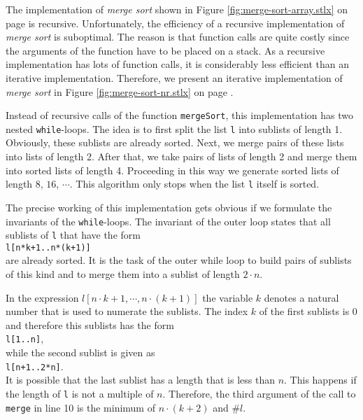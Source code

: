 \noindent
The implementation of \emph{merge sort} shown in Figure \ref{fig:merge-sort-array.stlx} on page
\pageref{fig:merge-sort-array.stlx} is recursive.  Unfortunately, the efficiency of a recursive
implementation of \emph{merge sort} is suboptimal.  The reason is that function calls are quite
costly since the arguments of the function have to be placed on a stack.  As a recursive
implementation has lots of function calls, it is considerably less efficient than an iterative
implementation.  Therefore, we present an iterative implementation of \emph{merge sort} in Figure
\ref{fig:merge-sort-nr.stlx} on page \pageref{fig:merge-sort-nr.stlx}.

Instead of recursive calls of the function \texttt{mergeSort}, this implementation has two nested 
\texttt{while}-loops.  The idea is to first split the list \texttt{l} into sublists of length 1.
Obviously, these sublists are already sorted.  Next, we merge pairs of these lists into lists of
length 2.  After that, we take pairs of lists of length 2 and merge them into sorted lists of length
4. Proceeding in this way we generate sorted lists of length
$8$, $16$, $\cdots$.  This algorithm only stops when the list \texttt{l} itself is sorted.

The precise working of this implementation gets obvious if we formulate the invariants of the
\texttt{while}-loops.  The invariant of the outer loop states that all sublists of \texttt{l} 
that have the form
\\[0.2cm]
\hspace*{1.3cm}
\texttt{l[n*k+1..n*(k+1)]}
\\[0.2cm]
are already sorted.  It is the task of the outer while loop to build pairs of sublists of this kind
and to merge them into a sublist of length $2 \cdot n$.

In the expression $l[n \cdot k + 1, \cdots, n \cdot (k+1)]$ the variable $k$ denotes a natural
number that is used to numerate the sublists.  The index $k$ of the first sublists is $0$ and
therefore this sublists has the form
\\[0.2cm]
\hspace*{1.3cm}
\texttt{l[1..n]},
\\[0.2cm]
while the second sublist is given as
\\[0.2cm]
\hspace*{1.3cm}
\texttt{l[n+1..2*n]}.
\\[0.2cm]
It is possible that the last sublist has a length that is less than $n$.  This happens if the length
of \texttt{l} is not a multiple of $n$.  Therefore, the third argument of the call to \texttt{merge}
in line 10 is the minimum of $n\cdot(k+2)$ and $\mathtt{\#}l$.

